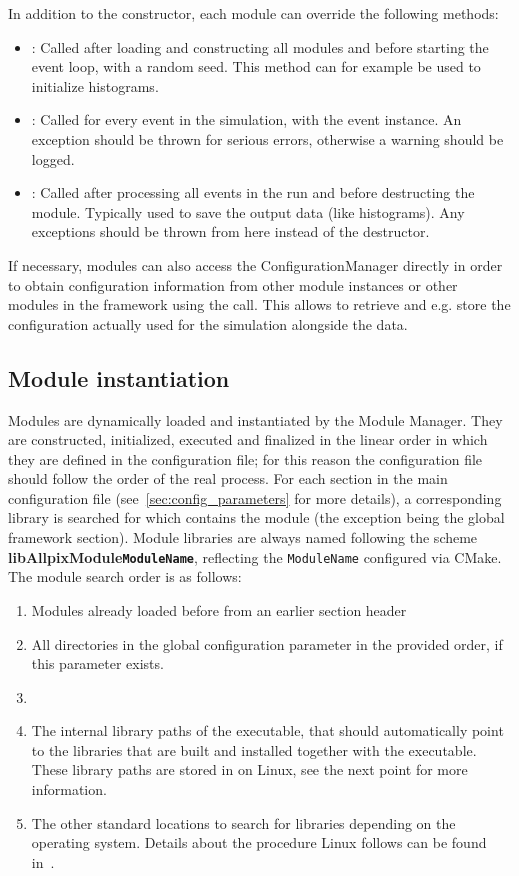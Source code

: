In addition to the constructor, each module can override the following methods:
\begin{itemize}
\item {}: Called after loading and constructing all modules and before starting the event loop, with a random seed.
This method can for example be used to initialize histograms.
\item {}: Called for every event in the simulation, with the event instance.
An exception should be thrown for serious errors, otherwise a warning should be logged.
\item {}: Called after processing all events in the run and before destructing the module.
Typically used to save the output data (like histograms).
Any exceptions should be thrown from here instead of the destructor.
\end{itemize}

If necessary, modules can also access the ConfigurationManager directly in order to obtain configuration information from other module instances or other modules in the framework using the  call.
This allows to retrieve and e.g. store the configuration actually used for the simulation alongside the data.

\subsection{Module instantiation}
\label{sec:module_instantiation}
Modules are dynamically loaded and instantiated by the Module Manager.
They are constructed, initialized, executed and finalized in the linear order in which they are defined in the configuration file; for this reason the configuration file should follow the order of the real process.
For each section in the main configuration file (see~\ref{sec:config_parameters} for more details), a corresponding library is searched for which contains the module (the exception being the global framework section).
Module libraries are always named following the scheme \textbf{libAllpixModule\texttt{ModuleName}}, reflecting the \texttt{ModuleName} configured via CMake.
The module search order is as follows:
\begin{enumerate}
\item Modules already loaded before from an earlier section header
\item All directories in the global configuration parameter  in the provided order, if this parameter exists.
\item \item The internal library paths of the executable, that should automatically point to the libraries that are built and installed together with the executable.
These library paths are stored in  on Linux, see the next point for more information.
\item The other standard locations to search for libraries depending on the operating system.
Details about the procedure Linux follows can be found in~\cite{linuxld}.
\end{enumerate}

